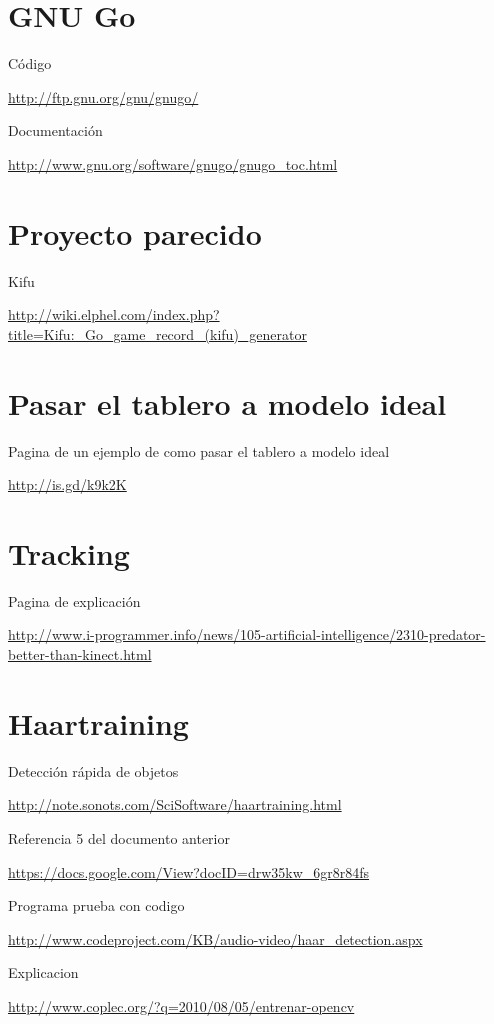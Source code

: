 \documentclass[12pt,a4paper]{report}
\begin{document}
\section{GNU Go}

Código

\url{http://ftp.gnu.org/gnu/gnugo/}

Documentación

\url{http://www.gnu.org/software/gnugo/gnugo_toc.html}

\section{Proyecto parecido}

Kifu

\url{http://wiki.elphel.com/index.php?title=Kifu:_Go_game_record_(kifu)_generator}

\section{Pasar el tablero a modelo ideal}

Pagina de un ejemplo de como pasar el tablero a modelo ideal

\url{http://is.gd/k9k2K}


\section{Tracking }

Pagina de explicación

\url{http://www.i-programmer.info/news/105-artificial-intelligence/2310-predator-better-than-kinect.html}

\section{Haartraining}

Detección rápida de objetos

\url{http://note.sonots.com/SciSoftware/haartraining.html}

Referencia 5 del documento anterior

\url{https://docs.google.com/View?docID=drw35kw_6gr8r84fs}

Programa prueba con codigo

\url{http://www.codeproject.com/KB/audio-video/haar_detection.aspx}

Explicacion

\url{http://www.coplec.org/?q=2010/08/05/entrenar-opencv}
\end{document}
